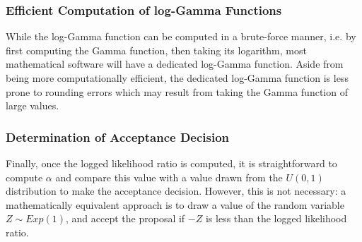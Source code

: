 \documentclass[12pt]{article}
\begin{document}
	\subsubsection{Efficient Computation of log-Gamma Functions}
	While the log-Gamma function can be computed in a brute-force manner, i.e. by first computing the Gamma function, then taking its logarithm, most mathematical software will have a dedicated log-Gamma function. Aside from being more computationally efficient, the dedicated log-Gamma function is less prone to rounding errors which may result from taking the Gamma function of large values.
	
	\subsubsection{Determination of Acceptance Decision}
	Finally, once the logged likelihood ratio is computed, it is straightforward to compute $\alpha$ and compare this value with a value drawn from the $U(0,1)$ distribution to make the acceptance decision. However, this is not necessary: a mathematically equivalent approach is to draw a value of the random variable $Z\sim Exp(1)$, and accept the proposal if $-Z$ is less than the logged likelihood ratio.
\end{document}
